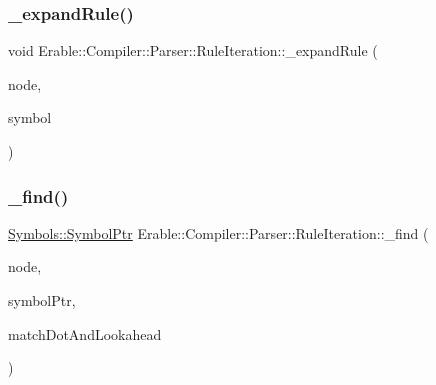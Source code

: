 \subsubsection{\texorpdfstring{\_expandRule()}{\_expandRule()}}
{\footnotesize\ttfamily void Erable\+::\+Compiler\+::\+Parser\+::\+Rule\+Iteration\+::\+\_\+expand\+Rule (\begin{DoxyParamCaption}\item[{\mbox{\hyperlink{struct_erable_1_1_compiler_1_1_parser_1_1_iteration_node}{Iteration\+Node}} $\ast$}]{node,  }\item[{\mbox{\hyperlink{namespace_erable_1_1_compiler_1_1_symbols_a8f0bc762f448ea4d84e8713ab3e140b9}{Symbols\+::\+Symbol\+Ptr}} \&}]{symbol }\end{DoxyParamCaption})\hspace{0.3cm}{\ttfamily [protected]}}

\mbox{\label{class_erable_1_1_compiler_1_1_parser_1_1_rule_iteration_abfa1a1f8f0b9ac2afa7c386203156f1c}} 
\subsubsection{\texorpdfstring{\_find()}{\_find()}}
{\footnotesize\ttfamily \mbox{\hyperlink{namespace_erable_1_1_compiler_1_1_symbols_a8f0bc762f448ea4d84e8713ab3e140b9}{Symbols\+::\+Symbol\+Ptr}} Erable\+::\+Compiler\+::\+Parser\+::\+Rule\+Iteration\+::\+\_\+find (\begin{DoxyParamCaption}\item[{\mbox{\hyperlink{struct_erable_1_1_compiler_1_1_parser_1_1_iteration_node}{Iteration\+Node}} $\ast$}]{node,  }\item[{\mbox{\hyperlink{namespace_erable_1_1_compiler_1_1_symbols_a8f0bc762f448ea4d84e8713ab3e140b9}{Symbols\+::\+Symbol\+Ptr}}}]{symbol\+Ptr,  }\item[{bool}]{match\+Dot\+And\+Lookahead }\end{DoxyParamCaption})\hspace{0.3cm}{\ttfamily [protected]}}

\mbox{\label{class_erable_1_1_compiler_1_1_parser_1_1_rule_iteration_a04aa2fb027d1e4787198c8c6373d1422}} 
